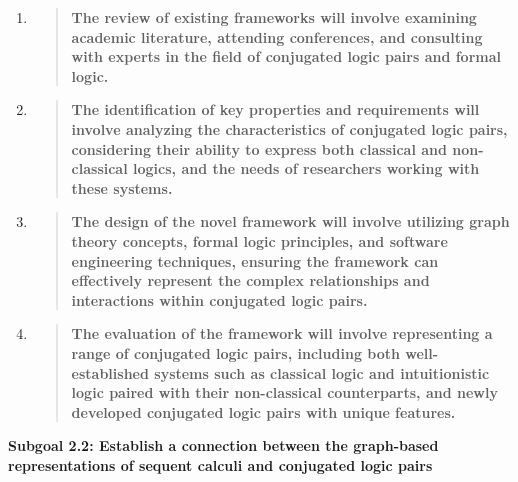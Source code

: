 \begin{itemize}
  \begin{enumerate}
  \def\labelenumi{\arabic{enumi}.}
  \item
    \begin{quote}
    \textbf{The review of existing frameworks will involve examining
    academic literature, attending conferences, and consulting with
    experts in the field of conjugated logic pairs and formal logic.\\
    }
    \end{quote}
  \item
    \begin{quote}
    \textbf{The identification of key properties and requirements will
    involve analyzing the characteristics of conjugated logic pairs,
    considering their ability to express both classical and
    non-classical logics, and the needs of researchers working with
    these systems.\\
    }
    \end{quote}
  \item
    \begin{quote}
    \textbf{The design of the novel framework will involve utilizing
    graph theory concepts, formal logic principles, and software
    engineering techniques, ensuring the framework can effectively
    represent the complex relationships and interactions within
    conjugated logic pairs.\\
    }
    \end{quote}
  \item
    \begin{quote}
    \textbf{The evaluation of the framework will involve representing a
    range of conjugated logic pairs, including both well-established
    systems such as classical logic and intuitionistic logic paired with
    their non-classical counterparts, and newly developed conjugated
    logic pairs with unique features.\\
    }
    \end{quote}
  \end{enumerate}
\end{itemize}

\textbf{Subgoal 2.2: Establish a connection between the graph-based
representations of sequent calculi and conjugated logic pairs}

